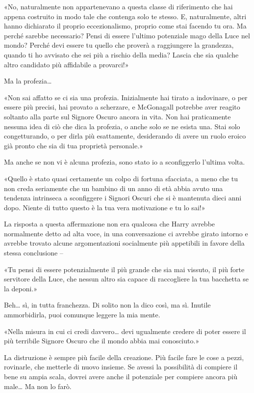 «No, naturalmente non appartenevano a questa classe di riferimento che hai appena costruito in modo tale che contenga solo te stesso. E, naturalmente, altri hanno dichiarato il proprio eccezionalismo, proprio come stai facendo tu ora. Ma perché sarebbe necessario? Pensi di essere l’ultimo potenziale mago della Luce nel mondo? Perché devi essere tu quello che proverà a raggiungere la grandezza, quando ti ho avvisato che sei più a rischio della media? Lascia che sia qualche altro candidato più affidabile a provarci!»

Ma la profezia…

«Non sai affatto se ci sia una profezia. Inizialmente hai tirato a indovinare, o per essere più precisi, hai provato a scherzare, e McGonagall potrebbe aver reagito soltanto alla parte sul Signore Oscuro ancora in vita. Non hai praticamente nessuna idea di ciò che dica la profezia, o anche solo se ne esista una. Stai solo congetturando, o per dirla più esattamente, desiderando di avere un ruolo eroico già pronto che sia di tua proprietà personale.»

Ma anche se non vi è alcuna profezia, sono stato io a sconfiggerlo l’ultima volta.

«Quello è stato quasi certamente un colpo di fortuna sfacciata, a meno che tu non creda seriamente che un bambino di un anno di età abbia avuto una tendenza intrinseca a sconfiggere i Signori Oscuri che si è mantenuta dieci anni dopo. Niente di tutto questo è la tua vera motivazione e tu lo sai!»

La risposta a questa affermazione non era qualcosa che Harry avrebbe normalmente detto ad alta voce, in una conversazione ci avrebbe girato intorno e avrebbe trovato alcune argomentazioni socialmente più appetibili in favore della stessa conclusione –

«Tu pensi di essere potenzialmente il più grande che sia mai vissuto, il più forte servitore della Luce, che nessun altro sia capace di raccogliere la tua bacchetta se la deponi.»

Beh… sì, in tutta franchezza. Di solito non la dico così, ma sì. Inutile ammorbidirla, puoi comunque leggere la mia mente.

«Nella misura in cui ci credi davvero… devi ugualmente credere di poter essere il più terribile Signore Oscuro che il mondo abbia mai conosciuto.»

La distruzione è sempre più facile della creazione. Più facile fare le cose a pezzi, rovinarle, che metterle di nuovo insieme. Se avessi la possibilità di compiere il bene su ampia scala, dovrei avere anche il potenziale per compiere ancora più male… Ma non lo farò.

